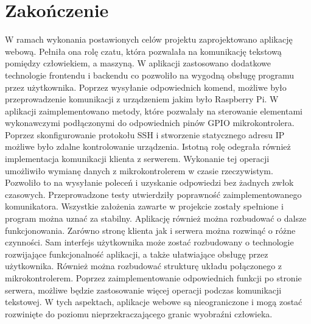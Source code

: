 \section{Zakończenie}
W ramach wykonania postawionych celów projektu zaprojektowano aplikację webową. Pełniła ona rolę czatu, która pozwalała na komunikację tekstową pomiędzy człowiekiem, a maszyną. W aplikacji zastosowano dodatkowe technologie frontendu i backendu co pozwoliło na wygodną obsługę programu przez użytkownika. Poprzez wysyłanie odpowiednich komend, możliwe było przeprowadzenie komunikacji z urządzeniem jakim było Raspberry Pi. W aplikacji zaimplementowano metody, które pozwalały na sterowanie elementami wykonawczymi podłączonymi do odpowiednich pinów GPIO mikrokontrolera. Poprzez skonfigurowanie protokołu SSH i stworzenie statycznego adresu IP możliwe było zdalne kontrolowanie urządzenia. Istotną rolę odegrała również implementacja komunikacji klienta z serwerem. Wykonanie tej operacji umożliwiło wymianę danych z mikrokontrolerem w czasie rzeczywistym. Pozwoliło to na wysyłanie poleceń i uzyskanie odpowiedzi bez żadnych zwłok czasowych. Przeprowadzone testy utwierdziły poprawność zaimplementowanego komunikatora. Wszystkie założenia zawarte w projekcie zostały spełnione i program można uznać za stabilny. Aplikację również można rozbudować o dalsze funkcjonowania. Zarówno stronę klienta jak i serwera można rozwinąć o różne czynności. Sam interfejs użytkownika może zostać rozbudowany o technologie rozwijające funkcjonalność aplikacji, a także ułatwiające obsługę przez użytkownika. Również można rozbudować strukturę układu połączonego z mikrokontrolerem. Poprzez zaimplementowanie odpowiednich funkcji po stronie serwera, możliwe będzie zastosowanie więcej operacji podczas komunikacji tekstowej. W tych aspektach, aplikacje webowe są nieograniczone i mogą zostać rozwinięte do poziomu nieprzekraczającego granic wyobraźni człowieka.